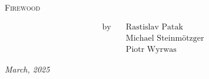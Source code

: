 \vspace*{\fill}
\begin{center}
	\huge \textsc{Firewood\texttrademark}
\end{center}
\vspace{.5\baselineskip}
\begin{align*}
	\text{by} \quad &\text{Rastislav Patak} \\
			&\text{Michael Steinm\"otzger} \\
			&\text{Piotr Wyrwas}
\end{align*}
\vspace{.5mm}
\begin{center}
	\textit{March, 2025}
\end{center}
\vspace*{\fill}
